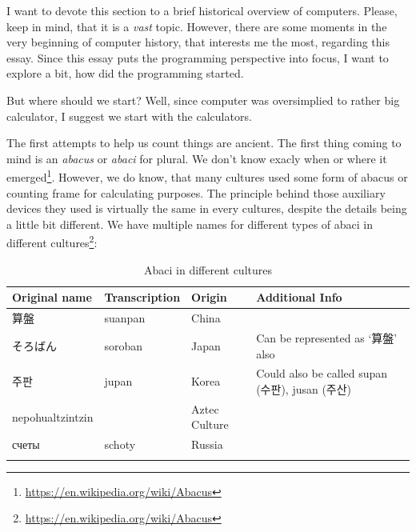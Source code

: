 \documentclass{report}
\begin{document}
            I want to devote this section to a brief historical overview of computers. Please, keep in mind, that it is a \emph{vast} topic. However, there are some moments in the very
            beginning of computer history, that interests me the most, regarding this essay. Since this essay puts the programming perspective into focus, I want to explore 
            a bit, how did the programming started. \par

            But where should we start? Well, since computer was oversimplied to rather big calculator, I suggest we start with the calculators.\par

            The first attempts to help us count things are ancient. The first thing coming to mind is an \emph{abacus} or \emph{abaci} for plural. We don't know exacly when or
            where it emerged\footnote{\href{https://en.wikipedia.org/wiki/Abacus}{https://en.wikipedia.org/wiki/Abacus}}. However, we do know, that many cultures used some form
            of abacus or counting frame for calculating purposes. The principle behind those auxiliary devices they used is virtually the same in every cultures, despite the 
            details being a little bit different. We have multiple names for different types of abaci in different
            cultures\footnote{\href{https://en.wikipedia.org/wiki/Abacus}{https://en.wikipedia.org/wiki/Abacus}}:
            \begin{table}[h]
                \centering
                \begin{longtable} {p{}p{}p{}p{}}
                    \toprule
                    Original name & Transcription & Origin & Additional Info \\
                    \toprule
                    算盤 & suanpan & China & \\
                    そろばん & soroban & Japan & Can be represented as `算盤' also \\
                    주판 & jupan & Korea & Could also be called supan (수판), jusan (주산) \\
                    nepohualtzintzin & & Aztec Culture & \\
                    счеты & schoty & Russia & \\
                    \bottomrule
                    \caption{Abaci in different cultures}
                    \end{longtable}
            \end{table}
\end{document}
